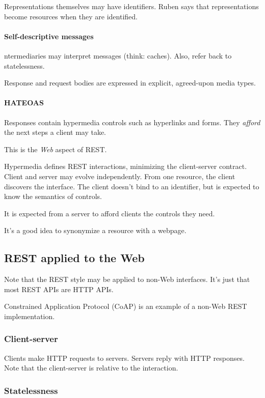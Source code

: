 \documentclass{report}
\begin{document}
Representations themselves may have identifiers.
Ruben says that representations become resources
when they are identified.

\paragraph{Self-descriptive messages}

ntermediaries may interpret messages (think: caches).
Also, refer back to statelessness.

Response and request bodies are expressed
in explicit, agreed-upon media types.

\paragraph{HATEOAS}

Responses contain hypermedia controls such as hyperlinks and forms.
They \emph{afford} the next steps a client may take.

This is the \emph{Web} aspect of REST.

Hypermedia defines REST interactions,
minimizing the client-server contract.
Client and server may evolve independently.
From one resource, the client discovers the interface.
The client doesn't bind to an identifier,
but is expected to know the semantics of controls.

It is expected from a server to afford
clients the controls they need.

It's a good idea to synonymize a resource with a webpage.

\subsection{REST applied to the Web}

Note that the REST style may be applied to non-Web interfaces.
It's just that most REST APIs are HTTP APIs.

Constrained Application Protocol (CoAP) is an example
of a non-Web REST implementation.

\subsubsection{Client-server}

Clients make HTTP requests to servers.
Servers reply with HTTP responses.
Note that the client-server is relative to the interaction.

\subsubsection{Statelessness}
\end{document}
